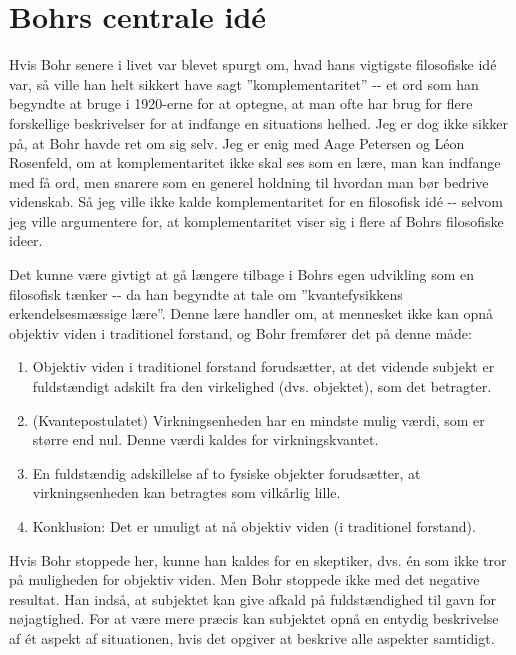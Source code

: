 \documentclass[12pt]{article}
\begin{document}
\hypertarget{bohrs-centrale-iduxe9}{%
  \section{Bohrs centrale idé}\label{bohrs-centrale-iduxe9}}

Hvis Bohr senere i livet var blevet spurgt om, hvad hans vigtigste
filosofiske idé var, så ville han helt sikkert have sagt
''komplementaritet'' -\/- et ord som han begyndte at bruge i 1920-erne
for at optegne, at man ofte har brug for flere forskellige beskrivelser
for at indfange en situations helhed. Jeg er dog ikke sikker på, at Bohr
havde ret om sig selv. Jeg er enig med Aage Petersen og Léon Rosenfeld,
om at komplementaritet ikke skal ses som en lære, man kan indfange med
få ord, men snarere som en generel holdning til hvordan man bør bedrive
videnskab. Så jeg ville ikke kalde komplementaritet for en filosofisk
idé -\/- selvom jeg ville argumentere for, at komplementaritet viser sig
i flere af Bohrs filosofiske ideer.

Det kunne være givtigt at gå længere tilbage i Bohrs egen udvikling som
en filosofisk tænker -\/- da han begyndte at tale om ''kvantefysikkens
erkendelsesmæssige lære''. Denne lære handler om, at mennesket ikke kan
opnå objektiv viden i traditionel forstand, og Bohr fremfører det på
denne måde:

\begin{enumerate}
\def\labelenumi{\arabic{enumi}.}
\item
  Objektiv viden i traditionel forstand forudsætter, at det vidende
  subjekt er fuldstændigt adskilt fra den virkelighed (dvs. objektet),
  som det betragter.
\item
  (Kvantepostulatet) Virkningsenheden har en mindste mulig værdi, som er
  større end nul. Denne værdi kaldes for virkningskvantet.
\item
  En fuldstændig adskillelse af to fysiske objekter forudsætter, at
  virkningsenheden kan betragtes som vilkårlig lille.
\item
  Konklusion: Det er umuligt at nå objektiv viden (i traditionel
  forstand).
\end{enumerate}

Hvis Bohr stoppede her, kunne han kaldes for en skeptiker, dvs. én som
ikke tror på muligheden for objektiv viden. Men Bohr stoppede ikke med
det negative resultat. Han indså, at subjektet kan give afkald på
fuldstændighed til gavn for nøjagtighed. For at være mere præcis kan
subjektet opnå en entydig beskrivelse af ét aspekt af situationen, hvis
det opgiver at beskrive alle aspekter samtidigt.
\end{document}

